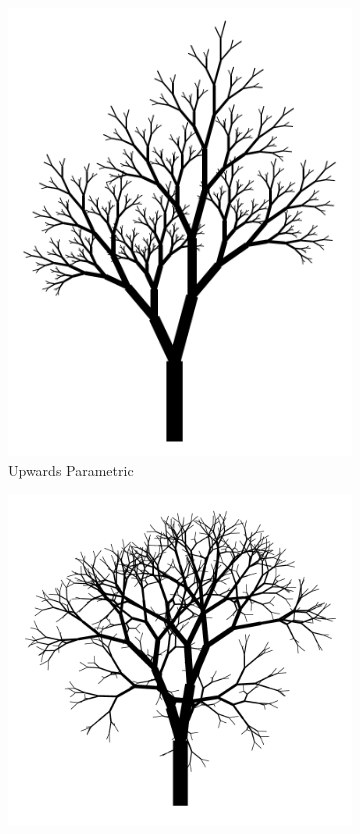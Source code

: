 \documentclass[12pt,twoside]{reedthesis}
\begin{document}
	\begin{figure}[h]
	\centering
	\begin{subfigure}{0.5\linewidth}
		\centering
		\includegraphics[width=\linewidth]{Images/Parametric1}
		\caption{Upwards Parametric}
		\label{UpwardParametric}
	\end{subfigure}%
	\begin{subfigure}{0.5\linewidth}
		\centering
		\includegraphics[width=\linewidth]{Images/Parametric2}

\end{subfigure}
\end{figure}
\end{document}

